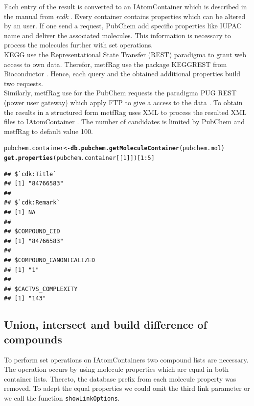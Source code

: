 \documentclass[12pt, a4paper]{scrartcl}\usepackage[]{graphicx}\usepackage[]{color}
\makeatletter
\newcommand{\hlnum}[1]{\textcolor[rgb]{0.686,0.059,0.569}{#1}}%
\newcommand{\hlopt}[1]{\textcolor[rgb]{0,0,0}{#1}}%
\newcommand{\hlstd}[1]{\textcolor[rgb]{0.345,0.345,0.345}{#1}}%
\newcommand{\hlkwb}[1]{\textcolor[rgb]{0.69,0.353,0.396}{#1}}%
\newcommand{\hlkwd}[1]{\textcolor[rgb]{0.737,0.353,0.396}{\textbf{#1}}}%
\newenvironment{kframe}{%
 \def\at@end@of@kframe{}%
 \ifinner\ifhmode%
  \def\at@end@of@kframe{\end{minipage}}%
  \begin{minipage}{\columnwidth}%
 \fi\fi%
 \def\FrameCommand##1{\hskip\@totalleftmargin \hskip-\fboxsep
 \colorbox{shadecolor}{##1}\hskip-\fboxsep
     \hskip-\linewidth \hskip-\@totalleftmargin \hskip\columnwidth}%
 \MakeFramed {\advance\hsize-\width
   \@totalleftmargin\z@ \linewidth\hsize
   \@setminipage}}%
 {\par\unskip\endMakeFramed%
 \at@end@of@kframe}
\newenvironment{knitrout}{}{} %
\newcommand{\Rfunction}[1]{{\texttt{#1}}}
\newcommand{\Rpackage}[1]{{\textit{#1}}}
\makeatother
\begin{document}
Each entry of the result is converted to an IAtomContainer which is described in the manual from 
\Rpackage{rcdk} \cite{Guha2007}. Every container contains properties which can be altered by an user. If one send a request, PubChem add specific properties like IUPAC name and deliver the associated molecules. This information is necessary to process the molecules further with set operations. \\[0.5em]
KEGG use the Representational State Transfer (REST) paradigma to grant web access to own data. Therefor, metfRag use the package KEGGREST from Bioconductor \cite{Tenenbaum}. Hence, each query and the obtained additional properties build two requests. \\[0.5em]
Similarly, metfRag use for the PubChem requests the paradigma PUG REST (power user gateway) which apply FTP to give a access to the data \cite{Southern2011}. To obtain the results in a structured form metfRag uses XML to process the resulted XML files to IAtomContainer \cite{Lang2013b}. The number of candidates is limited by PubChem and metfRag to default value 100.

\begin{knitrout}
\color{fgcolor}\begin{kframe}
\begin{alltt}
  \hlstd{pubchem.container} \hlkwb{<-} \hlkwd{db.pubchem.getMoleculeContainer}\hlstd{(pubchem.mol)}
  \hlkwd{get.properties}\hlstd{(pubchem.container[[}\hlnum{1}\hlstd{]])[}\hlnum{1}\hlopt{:}\hlnum{5}\hlstd{]}
\end{alltt}
\begin{verbatim}
## $`cdk:Title`
## [1] "84766583"
## 
## $`cdk:Remark`
## [1] NA
## 
## $COMPOUND_CID
## [1] "84766583"
## 
## $COMPOUND_CANONICALIZED
## [1] "1"
## 
## $CACTVS_COMPLEXITY
## [1] "143"
\end{verbatim}
\end{kframe}
\end{knitrout}

\newpage
\subsection{Union, intersect and build difference of compounds}
To perform set operations on IAtomContainers two compound lists are necessary. The operation occurs by using molecule 
properties which are equal in both container lists. 
Thereto, the database prefix from each molecule property was removed. To adept the equal properties we could omit the third link parameter or we call the function \Rfunction{showLinkOptions}.
\end{document}
